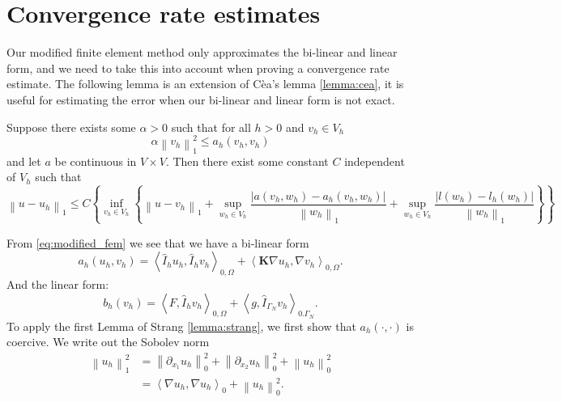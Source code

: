 \documentclass[../Main/main.tex]{subfiles}
\begin{document}
	\section{Convergence rate estimates}
	Our modified finite element method only approximates the bi-linear and linear form, and we need to take this into account when proving a convergence rate estimate. The following lemma is an extension of Cèa's lemma \ref{lemma:cea}, it is useful for estimating the error when our bi-linear and linear form is not exact.
	\begin{lemma}\label{lemma:strang}
		Suppose there exists some $\alpha>0$ such that for all $h>0$ and $v_h\in V_h$
		\begin{equation*}
			\alpha \left \| v_h \right \|^2_1 \leq a_h(v_h,v_h) 
		\end{equation*}
		and let $a$ be continuous in $V\times V$. Then there exist some constant $C$ independent of $V_h$ such that
		\begin{equation}\label{eq:strang_ineq}
			\left \| u-u_h \right \|_1 \leq C\left \{ \inf_{v_h \in V_h}\left \{ \left \| u-v_h \right \|_1 + \sup_{w_h\in V_h}\frac{|a(v_h,w_h)-a_h(v_h,w_h)|}{\left \| w_h \right \|_1}+\sup_{w_h\in V_h}\frac{|l(w_h)-l_h(w_h)|}{\left \| w_h \right \|_1} \right \} \right \}
		\end{equation}
	\end{lemma}
	From \eqref{eq:modified_fem} we see that we have a bi-linear form 
	\begin{equation}
		a_h(u_h,v_h) = \left \langle \hat{I}_h u_h, \hat{I}_h v_h \right \rangle_{0,\Omega} +  \left \langle\bm{K} \nabla u_h, \nabla v_h \right \rangle_{0,\Omega}.
	\end{equation}
	And the linear form:
	\begin{equation}
		b_h(v_h)= \left \langle F,\hat{I}_h v_h \right \rangle_{0,\Omega} + \left \langle g,\hat{I}_{\Gamma_N} v_h \right \rangle_{0.\Gamma_N}.
	\end{equation}
	To apply the first Lemma of Strang \ref{lemma:strang}, we first show that $a_h(\cdot,\cdot)$ is coercive. We write out the Sobolev norm
	\begin{equation}
		\begin{aligned}
			\left \| u_h \right \|_1^2 &= \left \| \partial_{x_1} u_h \right \|_0^2 + \left \| \partial_{x_2} u_h \right \|_0^2 + \left \| u_h \right \|_0^2 \\
			&= \left \langle \nabla u_h,\nabla u_h \right \rangle_0 + \left \| u_h \right \|_0^2. \\
		\end{aligned}
		\end{equation}
\end{document}
